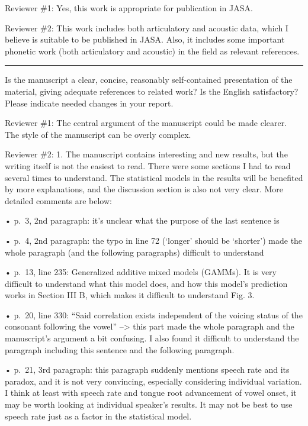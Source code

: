 \documentclass[]{article}
\begin{document}
Reviewer \#1: Yes, this work is appropriate for publication in JASA.

Reviewer \#2: This work includes both articulatory and acoustic data,
which I believe is suitable to be published in JASA. Also, it includes
some important phonetic work (both articulatory and acoustic) in the
field as relevant references.

\begin{center}\rule{0.5\linewidth}{\linethickness}\end{center}

Is the manuscript a clear, concise, reasonably self-contained
presentation of the material, giving adequate references to related
work? Is the English satisfactory? Please indicate needed changes in
your report.

Reviewer \#1: The central argument of the manuscript could be made
clearer. The style of the manuscript can be overly complex.

Reviewer \#2: 1. The manuscript contains interesting and new results,
but the writing itself is not the easiest to read. There were some
sections I had to read several times to understand. The statistical
models in the results will be benefited by more explanations, and the
discussion section is also not very clear. More detailed comments are
below:

• p.~3, 2nd paragraph: it's unclear what the purpose of the last
sentence is

• p.~4, 2nd paragraph: the typo in line 72 (`longer' should be
`shorter') made the whole paragraph (and the following paragraphs)
difficult to understand

• p.~13, line 235: Generalized additive mixed models (GAMMs). It is very
difficult to understand what this model does, and how this model's
prediction works in Section III B, which makes it difficult to
understand Fig. 3.

• p.~20, line 330: ``Said correlation exists independent of the voicing
status of the consonant following the vowel'' --\textgreater{} this part
made the whole paragraph and the manuscript's argument a bit confusing.
I also found it difficult to understand the paragraph including this
sentence and the following paragraph.

• p.~21, 3rd paragraph: this paragraph suddenly mentions speech rate and
its paradox, and it is not very convincing, especially considering
individual variation. I think at least with speech rate and tongue root
advancement of vowel onset, it may be worth looking at individual
speaker's results. It may not be best to use speech rate just as a
factor in the statistical model.
\end{document}
